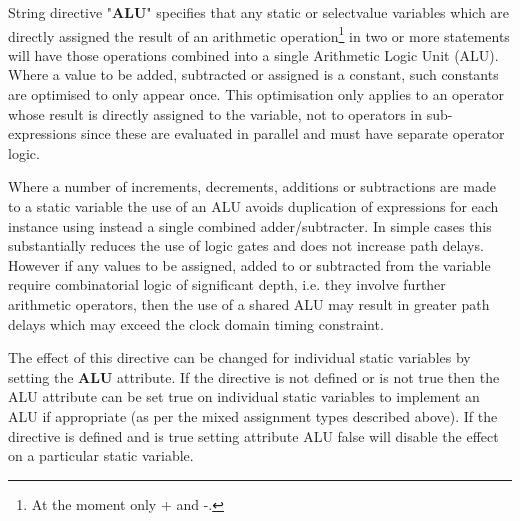         String directive "{\bf ALU}" specifies that any static or
        selectvalue variables which are directly assigned the result of an
        arithmetic operation\footnote{At the moment only + and -.} in two or
        more statements will have those operations combined into a single
        Arithmetic Logic Unit (ALU). Where a value to be added, subtracted or
        assigned is a constant, such constants are optimised to only appear
        once. This optimisation only applies to an operator whose result is
        directly assigned to the variable, not to operators in sub-expressions
        since these are evaluated in parallel and must have separate operator
        logic.
        
        Where a number of increments, decrements, additions or subtractions
        are made to a static variable the use of an ALU avoids duplication of
        expressions for each instance using instead a single combined
        adder/subtracter. In simple cases this substantially reduces
        the use of logic gates and does not increase path delays. However
        if any values to be assigned, added to or subtracted from the variable
        require combinatorial logic of significant depth, i.e. they involve
        further arithmetic operators, then the use of a shared ALU may
        result in greater path delays which may exceed the clock domain
        timing constraint.
        
        The effect of this directive can be changed for individual
        static variables by setting the {\bf ALU} attribute. If the directive
        is not defined or is not true then the ALU attribute can be set
        true on individual static variables to implement an ALU if
        appropriate (as per the mixed assignment types described above).
        If the directive is defined and is true setting attribute ALU
        false will disable the effect on a particular static variable.

